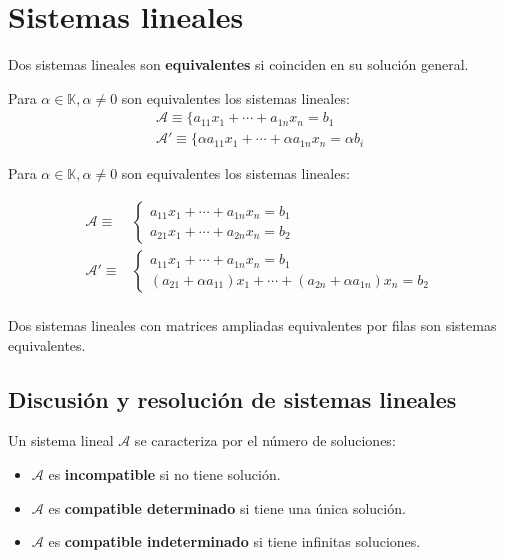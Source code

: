 \chapter{Sistemas lineales}

Dos sistemas lineales son \textbf{equivalentes} si coinciden en su solución general.

Para $\alpha \in \mathbb{K}, \alpha \neq 0$ son equivalentes los sistemas lineales:
\begin{align*}
\mathcal{A} \equiv \{ a_{11}x_1 + \cdots + a_{1n}x_n = b_1 \\
\mathcal{A'} \equiv \{ \alpha a_{11}x_1 + \cdots + \alpha  a_{1n}x_n = \alpha b_i
\end{align*}

Para $\alpha \in \mathbb{K}, \alpha \neq 0$ son equivalentes los sistemas lineales:

\begin{align*}
\mathcal{A} \equiv & \begin{cases}
a_{11}x_1 + \cdots + a_{1n}x_n = b_1 \\
a_{21}x_1 + \cdots + a_{2n}x_n = b_2 
\end{cases} \\
\mathcal{A'} \equiv & \begin{cases}
a_{11}x_1 + \cdots + a_{1n}x_n = b_1 \\
(a_{21} + \alpha a_{11})x_1 + \cdots + (a_{2n} + \alpha a_{1n})x_n = b_2 
\end{cases} \\
\end{align*}

Dos sistemas lineales con matrices ampliadas equivalentes por filas son sistemas equivalentes.

\section{Discusión y resolución de sistemas lineales}

Un sistema lineal $\mathcal{A}$ se caracteriza por el número de soluciones:
\begin{itemize}
\item $\mathcal{A}$ es \textbf{incompatible} si no tiene solución.
\item $\mathcal{A}$ es \textbf{compatible determinado} si tiene una única solución.
\item $\mathcal{A}$ es \textbf{compatible indeterminado} si tiene infinitas soluciones.
\end{itemize}

